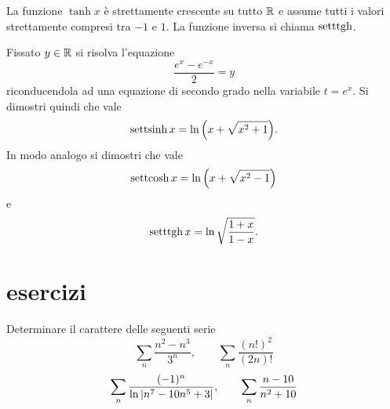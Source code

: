 La funzione $\tanh x$ è strettamente crescente su tutto $\mathbb R$ e assume tutti i valori strettamente compresi tra $-1$ e $1$.
La funzione inversa si chiama $\operatorname{setttgh}$.

\begin{exercise}
Fissato $y\in \mathbb R$ si risolva l'equazione
\[
  \frac{e^x - e^{-x}}{2} = y
\]
riconducendola ad una equazione di secondo grado nella variabile $t=e^x$.
Si dimostri quindi che vale
\[
  \operatorname{settsinh} x = \ln{\left( x + \sqrt{x^2 + 1} \right)}.
\]
In modo analogo si dimostri che vale
\[
  \operatorname{settcosh} x = \ln{\left( x + \sqrt{x^2 - 1} \right)}
\]
e
\[
  \operatorname{setttgh} x = \ln \sqrt{\frac{1+x}{1-x}}.
\]
\end{exercise}


\section{esercizi}
\begin{exercise}
Determinare il carattere delle seguenti serie
\[
  \sum_n \frac{n^2-n^3}{3^n}, \qquad
  \sum_n \frac{(n!)^2}{(2n)!}
\]
\[
\sum_n \frac{(-1)^n}{\ln{\left|n^7 - 10n^5 + 3\right|}},  \qquad
\sum_n \frac{n-10}{n^2+10}
\]
\end{exercise}
